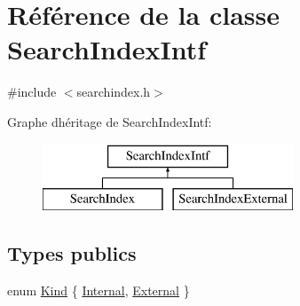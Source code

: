 \hypertarget{class_search_index_intf}{}\section{Référence de la classe Search\+Index\+Intf}
\label{class_search_index_intf}


{\ttfamily \#include $<$searchindex.\+h$>$}

Graphe d\textquotesingle{}héritage de Search\+Index\+Intf\+:\begin{figure}[H]
\begin{center}
\leavevmode
\includegraphics[height=2.000000cm]{class_search_index_intf}
\end{center}
\end{figure}
\subsection*{Types publics}
\begin{DoxyCompactItemize}
\item 
enum \hyperlink{class_search_index_intf_ade3dd4c1f8bc6487f0f3dccba5c6f9ea}{Kind} \{ \hyperlink{class_search_index_intf_ade3dd4c1f8bc6487f0f3dccba5c6f9eaa4e9f47fa9f92dd54889f2e95261a1041}{Internal}, 
\hyperlink{class_search_index_intf_ade3dd4c1f8bc6487f0f3dccba5c6f9eaa507071eac5d8808e1e91570d8c20523b}{External}
 \}
\end{DoxyCompactItemize}
